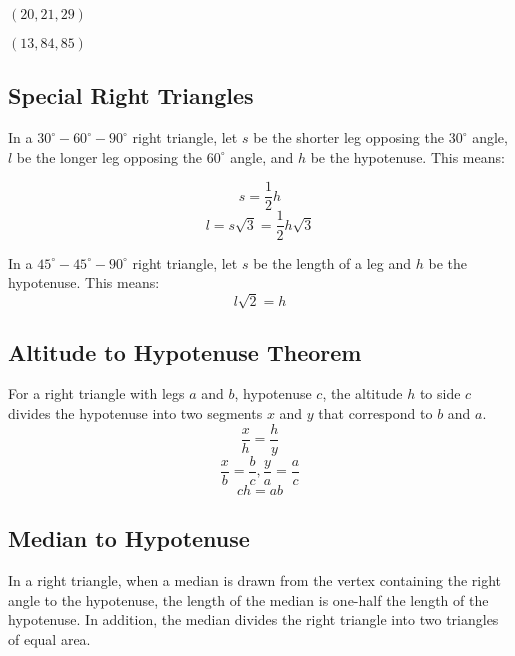 \documentclass[final, letterpaper, 12pt]{article}
\begin{document}
		$(20, 21, 29)$
		
		$(13, 84, 85)$
	
	\subsection{Special Right Triangles}\label{sec: patterns in special right triangles}
	
		In a $30^{\circ}-60^{\circ}-90^{\circ}$ right triangle, let $s$ be the shorter leg opposing the $30^{\circ}$ angle, $l$ be the longer leg opposing the $60^{\circ}$ angle, and $h$ be the hypotenuse. This means:
		
		\begin{equation}
			s = \frac{1}{2}h
		\end{equation}
		\begin{equation}
			l = s\sqrt{3} = \frac{1}{2}h\sqrt{3}
		\end{equation}
		
		In a $45^{\circ}-45^{\circ}-90^{\circ}$ right triangle, let $s$ be the length of a leg and $h$ be the hypotenuse. This means:
		\begin{equation}
			l\sqrt{2} = h
		\end{equation}
		
	
	\subsection{Altitude to Hypotenuse Theorem}\label{sec: altitude to hypotenuse theorem}
		For a right triangle with legs $a$ and $b$, hypotenuse $c$, the altitude $h$ to side $c$ divides the hypotenuse into two segments $x$ and $y$ that correspond to $b$ and $a$.
		\begin{equation}\label{sec: eqn:similarity relations 1}
			\frac{x}{h} = \frac{h}{y}
		\end{equation}
		\begin{equation}\label{sec: eqn:similarity relations 2}
			\frac{x}{b} = \frac{b}{c}, \frac{y}{a} = \frac{a}{c}
		\end{equation}
		\begin{equation}\label{sec: eqn:similarity relations 3}
			ch = ab 
		\end{equation} 
	
	\subsection{Median to Hypotenuse}\label{sec: median to hypotenuse}
		In a right triangle, when a median is drawn from the vertex containing the right angle to the hypotenuse, the length of the median is one-half the length of the hypotenuse. In addition, the median divides the right triangle into two triangles of equal area.
	
\end{document}

